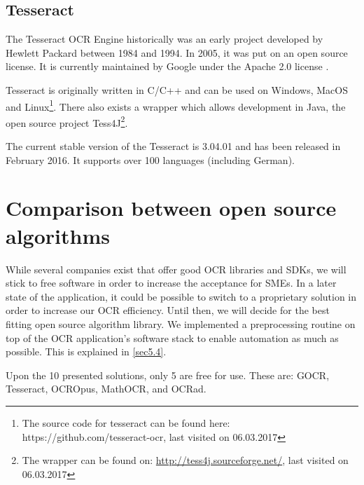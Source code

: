 \label{Tesseract}
\subsection{Tesseract}
The Tesseract OCR Engine historically was an early project developed by Hewlett Packard between 1984 and 1994. In 2005, it was put on an open source license. It is currently maintained by Google under the Apache 2.0 license \cite{smith07}.

Tesseract is originally written in C/C++ and can be used on Windows, MacOS and Linux\footnote{The source code for tesseract can be found here: https://github.com/tesseract-ocr, last visited on 06.03.2017}. There also exists a wrapper which allows development in Java, the open source project Tess4J\footnote{The wrapper can be found on: \url{http://tess4j.sourceforge.net/}, last visited on 06.03.2017}.

The current stable version of the Tesseract is 3.04.01 and has been released in February 2016. It supports over 100 languages (including German). 

\section{Comparison between open source algorithms}
\label{sec3.2}
While several companies exist that offer good OCR libraries and SDKs, we will stick to free software in order to increase the acceptance for SMEs. In a later state of the application, it could be possible to switch to a proprietary solution in order to increase our OCR efficiency. Until then, we will decide for the best fitting open source algorithm library. We implemented a preprocessing routine on top of the OCR application's software stack to enable automation as much as possible. This is explained in \ref{sec5.4}.

Upon the 10 presented solutions, only 5 are free for use. These are: GOCR, Tesseract, OCROpus, MathOCR, and OCRad.


